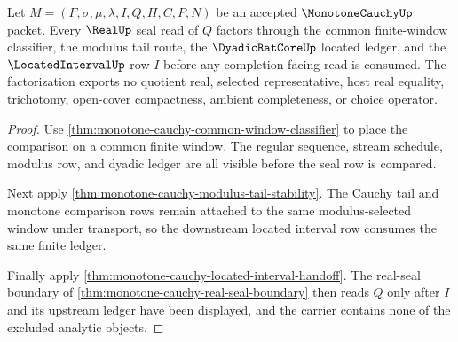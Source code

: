 \begin{theorem}
\label{thm:monotone-cauchy-real-seal-factorization-obligation}
Let $M=(F,\sigma,\mu,\lambda,I,Q,H,C,P,N)$ be an accepted $\MonotoneCauchyUp$ packet. Every $\RealUp$ seal read of $Q$ factors through the common finite-window classifier, the modulus tail route, the $\DyadicRatCoreUp$ located ledger, and the $\LocatedIntervalUp$ row $I$ before any completion-facing read is consumed. The factorization exports no quotient real, selected representative, host real equality, trichotomy, open-cover compactness, ambient completeness, or choice operator.
\end{theorem}
\begin{proof}
Use \autoref{thm:monotone-cauchy-common-window-classifier} to place the comparison on a common finite window. The regular sequence, stream schedule, modulus row, and dyadic ledger are all visible before the seal row is compared.

Next apply \autoref{thm:monotone-cauchy-modulus-tail-stability}. The Cauchy tail and monotone comparison rows remain attached to the same modulus-selected window under transport, so the downstream located interval row consumes the same finite ledger.

Finally apply \autoref{thm:monotone-cauchy-located-interval-handoff}. The real-seal boundary of \autoref{thm:monotone-cauchy-real-seal-boundary} then reads $Q$ only after $I$ and its upstream ledger have been displayed, and the carrier contains none of the excluded analytic objects.
\end{proof}

